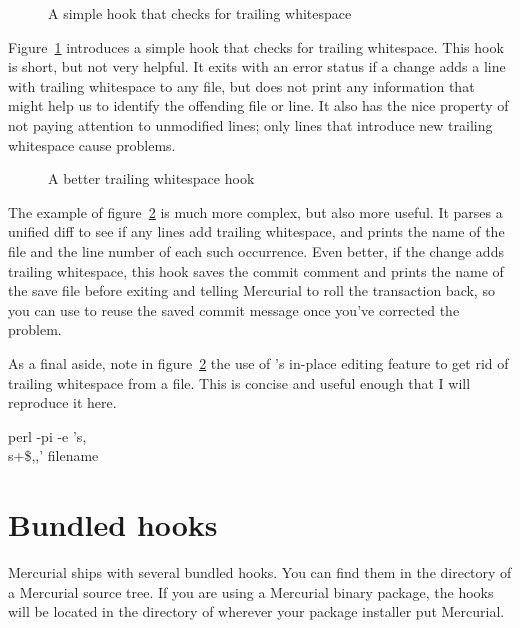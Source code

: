 \begin{figure}[ht]
  \caption{A simple hook that checks for trailing whitespace}
  \label{ex:hook:ws.simple}
\end{figure}

Figure~\ref{ex:hook:ws.simple} introduces a simple 
hook that checks for trailing whitespace.  This hook is short, but not
very helpful.  It exits with an error status if a change adds a line
with trailing whitespace to any file, but does not print any
information that might help us to identify the offending file or
line.  It also has the nice property of not paying attention to
unmodified lines; only lines that introduce new trailing whitespace
cause problems.

\begin{figure}[ht]
  \caption{A better trailing whitespace hook}
  \label{ex:hook:ws.better}
\end{figure}

The example of figure~\ref{ex:hook:ws.better} is much more complex,
but also more useful.  It parses a unified diff to see if any lines
add trailing whitespace, and prints the name of the file and the line
number of each such occurrence.  Even better, if the change adds
trailing whitespace, this hook saves the commit comment and prints the
name of the save file before exiting and telling Mercurial to roll the
transaction back, so you can use
 to reuse the
saved commit message once you've corrected the problem.

As a final aside, note in figure~\ref{ex:hook:ws.better} the use of
's in-place editing feature to get rid of trailing
whitespace from a file.  This is concise and useful enough that I will
reproduce it here.
\begin{codesample2}
  perl -pi -e 's,\\s+\$,,' filename
\end{codesample2}

\section{Bundled hooks}

Mercurial ships with several bundled hooks.  You can find them in the
 directory of a Mercurial source tree.  If you are
using a Mercurial binary package, the hooks will be located in the
 directory of wherever your package installer put
Mercurial.


